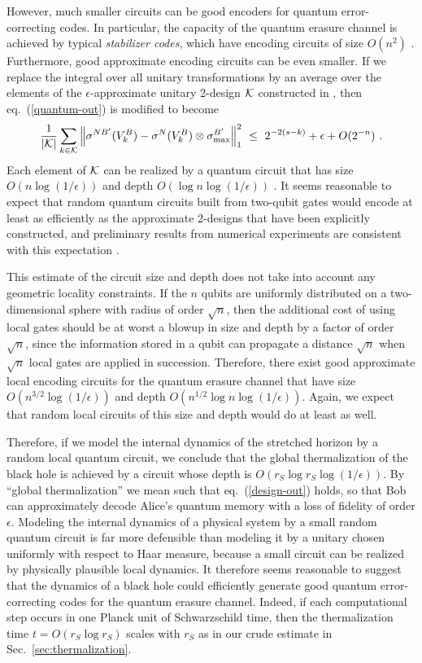 \documentclass[11pt]{article}
\begin{document}
However, much smaller circuits can be good encoders for quantum error-correcting codes. In particular, the capacity of the quantum erasure channel is achieved by typical {\em stabilizer codes}, which have encoding circuits of size $O(n^2)$ \cite{gottesman-thesis}. Furthermore, good approximate encoding circuits can be even smaller. If we replace the integral over all unitary transformations by an average over the elements of the $\epsilon$-approximate unitary 2-design ${\cal K}$ constructed in \cite{cleve}, then eq.~(\ref{quantum-out}) is modified to become
\begin{eqnarray}
\label{design-out}
\frac{1}{|{\cal K}|}\sum_{k\in{\cal K}} \left\| \sigma^{NB'}(V_k^B)-\sigma^{N}(V_k^B)\otimes \sigma^{B'}_{\rm max}\right\|_1^2 ~\le ~ 2^{-2(s-k)} +\epsilon + O(2^{-n})~.
\end{eqnarray}
Each element of ${\cal K}$ can be realized by a quantum circuit that has size $O(n\log(1/\epsilon))$ and depth $O(\log n\log (1/\epsilon))$ \cite{cleve,dankert}. It seems reasonable to expect that random quantum circuits built from two-qubit gates would encode at least as efficiently as the approximate 2-designs that have been explicitly constructed, and preliminary results from numerical experiments are consistent with this expectation \cite{anderson-sim}. 

This estimate of the circuit size and depth does not take into account any geometric locality constraints.  If the $n$ qubits are uniformly distributed on a two-dimensional sphere with radius of order $\sqrt{n}$, then  the additional cost of using local gates should be at worst a blowup in size and depth by a factor of order $\sqrt{n}$, since the information stored in a qubit can propagate a distance $\sqrt{n}$ when $\sqrt{n}$ local gates are applied in succession. Therefore, there exist good approximate local encoding circuits for the quantum erasure channel that have size $O(n^{3/2}\log(1/\epsilon))$ and depth $O(n^{1/2}\log n\log(1/\epsilon))$. Again, we expect that random local circuits of this size and depth would do at least as well.

Therefore, if we model the internal dynamics of the stretched horizon by a random local quantum circuit, we conclude that the global thermalization of the black hole is achieved by a circuit whose depth is $O(r_S\log r_S \log(1/\epsilon))$. By ``global thermalization'' we mean such that eq.~(\ref{design-out}) holds, so that Bob can approximately decode Alice's quantum memory with a loss of fidelity of order $\epsilon$. Modeling the internal dynamics of a physical system by a small random quantum circuit is far more defensible than modeling it by a unitary chosen uniformly with respect to Haar measure, because a small circuit can  be realized by physically plausible local dynamics. It therefore seems reasonable to suggest that the dynamics of a black hole could efficiently generate good quantum error-correcting codes for the quantum erasure channel. Indeed, if each computational step occurs in one Planck unit of Schwarzschild time, then the thermalization time $t=O(r_S\log r_S)$ scales with $r_S$ as in our crude estimate in Sec.~\ref{sec:thermalization}.
\end{document}

